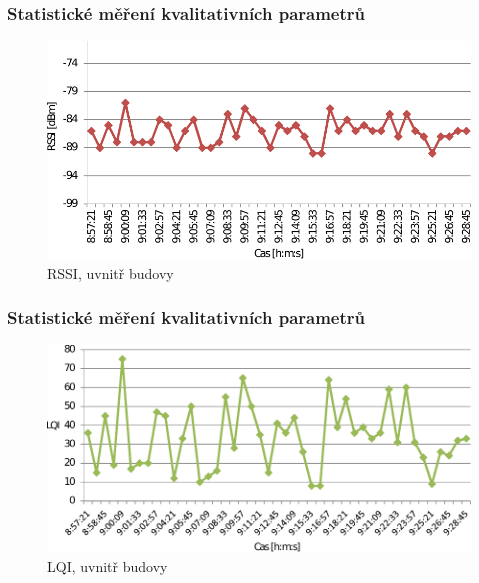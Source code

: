 \documentclass{beamer}
\begin{document}
	\begin{frame}
	\frametitle{Statistické měření kvalitativních parametrů}
	\begin{figure}[!ht]
	\centering%
	\includegraphics[scale=0.7, keepaspectratio]{3-rssi}%
	\caption{RSSI, uvnitř budovy}
	\end{figure}
	\end{frame}

	\begin{frame}
	\frametitle{Statistické měření kvalitativních parametrů}
	\begin{figure}[!ht]
	\centering%
	\includegraphics[scale=0.7, keepaspectratio]{3-lqi}%
	\caption{LQI, uvnitř budovy}
	\end{figure}
	\end{frame}
\end{document}
